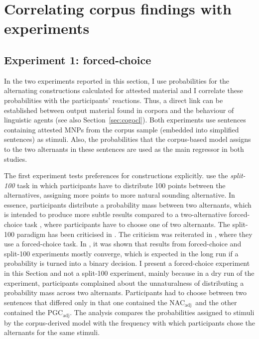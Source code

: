 \documentclass[USenglish]{article}
\newcommand{\Sub}[1]{\ensuremath{\mathrm{_{#1}}}}
\newcommand{\NACa}{NAC\Sub{adj}}
\newcommand{\PGCa}{PGC\Sub{adj}}
\begin{document}


\section{Correlating corpus findings with experiments}
\label{sec:experimental}

\subsection{Experiment 1: forced-choice}
\label{sec:exp:fc}

In the two experiments reported in this section, I use probabilities for the alternating constructions calculated for attested material and I correlate these probabilities with the participants' reactions.
Thus, a direct link can be established between output material found in corpora and the behaviour of linguistic agents (see also Section~\ref{sec:cogocl}).
Both experiments use sentences containing attested MNPs from the corpus sample (embedded into simplified sentences) as stimuli.
Also, the probabilities that the corpus-based model assigns to the two alternants in these sentences are used as the main regressor in both studies.

The first experiment tests preferences for constructions explicitly.
\cite{FordBresnan2013} use the \textit{split-100} task in which participants have to distribute 100 points between the alternatives, assigning more points to more natural sounding alternative.
In essence, participants distribute a probability mass between two alternants, which is intended to produce more subtle results compared to a two-alternative forced-choice task \citep{Rosenbach2013}, where participants have to choose one of two alternants.
The split-100 paradigm has been criticised in \cite{ArppeJaervikivi2007}.
The criticism was reiterated in \cite{DivjakEa2016}, where they use a forced-choice task.
In \cite{VerhoevenTemme2017}, it was shown that results from forced-choice and split-100 experiments mostly converge, which is expected in the long run if a probability is turned into a binary decision.
I present a forced-choice experiment in this Section and not a split-100 experiment, mainly because in a dry run of the experiment, participants complained about the unnaturalness of distributing a probability mass across two alternants.
Participants had to choose between two sentences that differed only in that one contained the \NACa\ and the other contained the \PGCa.
The analysis compares the probabilities assigned to stimuli by the corpus-derived model with the frequency with which participants chose the alternants for the same stimuli.
\end{document}
